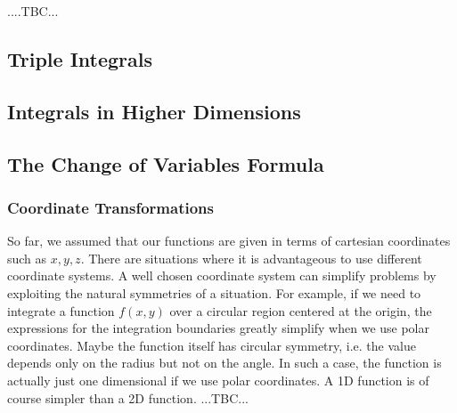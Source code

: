 

 ....TBC...





\subsection{Triple Integrals}


\subsection{Integrals in Higher Dimensions}


\subsection{The Change of Variables Formula}

\subsubsection{Coordinate Transformations}
So far, we assumed that our functions are given in terms of cartesian coordinates such as $x,y,z$. There are situations where it is advantageous to use different coordinate systems. A well chosen coordinate system can simplify problems by exploiting the natural symmetries of a situation. For example, if we need to integrate a function $f(x,y)$ over a circular region centered at the origin, the expressions for the integration boundaries greatly simplify when we use polar coordinates. Maybe the function itself has circular symmetry, i.e. the value depends only on the radius but not on the angle. In such a case, the function is actually just one dimensional if we use polar coordinates. A 1D function is of course simpler than a 2D function. 
...TBC...

